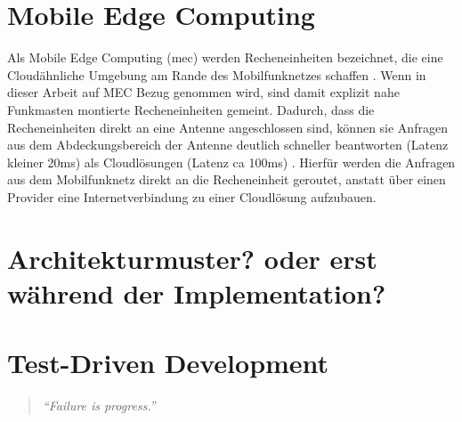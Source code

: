 \section{Mobile Edge Computing}

Als Mobile Edge Computing (\gls{mec}) werden Recheneinheiten bezeichnet, die eine Cloudähnliche Umgebung am Rande des Mobilfunknetzes schaffen \cite[4]{etsi:mec}.
Wenn in dieser Arbeit auf MEC Bezug genommen wird, sind damit explizit nahe Funkmasten montierte Recheneinheiten gemeint.
Dadurch, dass die Recheneinheiten direkt an eine Antenne angeschlossen sind, können sie Anfragen aus dem Abdeckungsbereich der Antenne deutlich schneller beantworten (Latenz kleiner 20ms) als Cloudlösungen (Latenz ca 100ms) \cite[2]{perf:mec:fraunhofer}.
Hierfür werden die Anfragen aus dem Mobilfunknetz direkt an die Recheneinheit geroutet, anstatt über einen Provider eine Internetverbindung zu einer Cloudlösung aufzubauen.



\section{Architekturmuster? oder erst während der Implementation?}


		


	
\section{Test-Driven Development}
\label{tdd}

\begin{quotation}
	\textit{\enquote{Failure is progress.}}
	\cite[5]{tdd}
\end{quotation}

